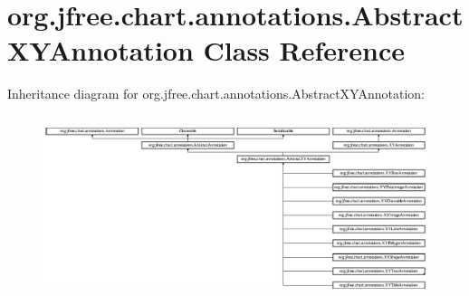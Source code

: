 \hypertarget{classorg_1_1jfree_1_1chart_1_1annotations_1_1_abstract_x_y_annotation}{}\section{org.\+jfree.\+chart.\+annotations.\+Abstract\+X\+Y\+Annotation Class Reference}
\label{classorg_1_1jfree_1_1chart_1_1annotations_1_1_abstract_x_y_annotation}
Inheritance diagram for org.\+jfree.\+chart.\+annotations.\+Abstract\+X\+Y\+Annotation\+:\begin{figure}[H]
\begin{center}
\leavevmode
\includegraphics[height=5.401929cm]{classorg_1_1jfree_1_1chart_1_1annotations_1_1_abstract_x_y_annotation}
\end{center}
\end{figure}
